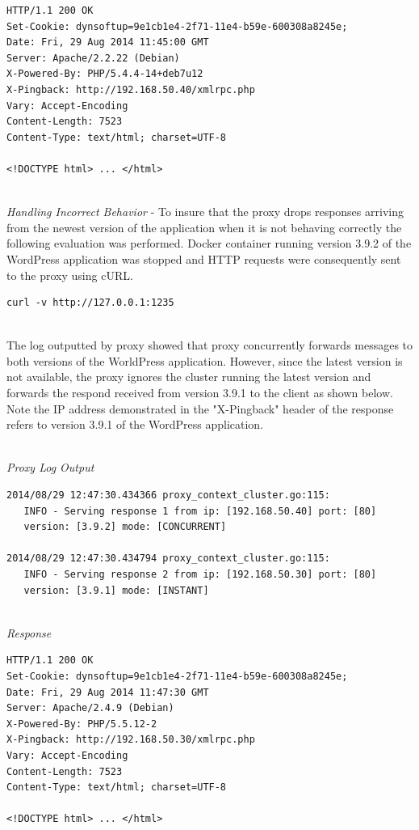 \documentclass[a4paper,11pt,twoside]{report}
\begin{document}
\begin{lstlisting}[language=terminal]
HTTP/1.1 200 OK
Set-Cookie: dynsoftup=9e1cb1e4-2f71-11e4-b59e-600308a8245e;
Date: Fri, 29 Aug 2014 11:45:00 GMT
Server: Apache/2.2.22 (Debian)
X-Powered-By: PHP/5.4.4-14+deb7u12
X-Pingback: http://192.168.50.40/xmlrpc.php
Vary: Accept-Encoding
Content-Length: 7523
Content-Type: text/html; charset=UTF-8

<!DOCTYPE html> ... </html>
\end{lstlisting}

\noindent\\
\textit{Handling Incorrect Behavior} - To insure that the proxy drops responses arriving from the newest version of the application when it is not behaving correctly the following evaluation was performed. Docker container running version 3.9.2 of the WordPress application was stopped and HTTP requests were consequently sent to the proxy using cURL.\smallskip

\begin{lstlisting}[language=terminal]
curl -v http://127.0.0.1:1235
\end{lstlisting}

\noindent\\
The log outputted by proxy showed that proxy concurrently forwards messages to both versions of the WorldPress application. However, since the latest version is not available, the proxy ignores the cluster running the latest version and forwards the respond received from version 3.9.1 to the client as shown below. Note the IP address demonstrated in the "X-Pingback" header of the response refers to version 3.9.1 of the WordPress application.    

\noindent\\
\textit{Proxy Log Output}
\begin{lstlisting}[language=terminal]
2014/08/29 12:47:30.434366 proxy_context_cluster.go:115:     
   INFO - Serving response 1 from ip: [192.168.50.40] port: [80] 
   version: [3.9.2] mode: [CONCURRENT]
   
2014/08/29 12:47:30.434794 proxy_context_cluster.go:115:     
   INFO - Serving response 2 from ip: [192.168.50.30] port: [80] 
   version: [3.9.1] mode: [INSTANT]
\end{lstlisting}


\noindent\\
\textit{Response}
\begin{lstlisting}[language=terminal] 
HTTP/1.1 200 OK
Set-Cookie: dynsoftup=9e1cb1e4-2f71-11e4-b59e-600308a8245e;
Date: Fri, 29 Aug 2014 11:47:30 GMT
Server: Apache/2.4.9 (Debian)
X-Powered-By: PHP/5.5.12-2
X-Pingback: http://192.168.50.30/xmlrpc.php
Vary: Accept-Encoding
Content-Length: 7523
Content-Type: text/html; charset=UTF-8

<!DOCTYPE html> ... </html>
\end{lstlisting}
 
\end{document}
